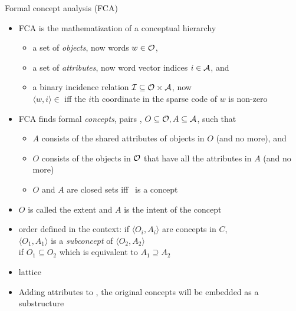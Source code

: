 \documentclass{beamer}
\newlength{\onecolwid}
\begin{document}
\begin{frame}[t]
\begin{columns}[t]
\begin{column}{\onecolwid}
      \begin{block}{Formal concept analysis (FCA)}
        \begin{itemize}
          \item FCA is the mathematization of a conceptual hierarchy
            \begin{itemize}
              \item a set of \emph{objects}, now words $w\in\mathcal O$,
              \item a set of \emph{attributes}, now word vector indices $i\in\mathcal A$, and
              \item a binary incidence relation
                $\mathcal I \subseteq \mathcal O \times \mathcal A$, now \\ 
                $\langle w,i\rangle\in$ iff the $i$th coordinate in the sparse code
                of $w$ is \alert{non-zero}
            \end{itemize}
          \item FCA finds formal \emph{concepts}, pairs \oaconc,
            $O\subseteq \mathcal O,A \subseteq \mathcal A$, such that
            \begin{itemize}
              \item $A$ consists of the shared attributes of objects in $O$
                (and no more), and
              \item $O$ consists of
                the objects in $\mathcal O$ that have all the attributes in $A$ (and
                no more)
              \item %
                $O$ and $A$ are closed sets iff \oaconc~is a concept
            \end{itemize}
          \item $O$ is called the extent and $A$ is the intent of the concept
          \item order defined in the context:
            if $\langle O_i , A_i \rangle$ are concepts in $C$, \\
            $\langle O_1 , A_1 \rangle$ is a \emph{subconcept} of $\langle
            O_2 , A_2 \rangle$ \\
            if $O_1 \subseteq O_2 $ which is equivalent to $A_1 \supseteq A_2 $
          \item lattice
          \item Adding attributes to \at,
            the original concepts will be embedded as a substructure

\end{itemize}
\end{block}
\end{column}
\end{columns}
\end{frame}
\end{document}
